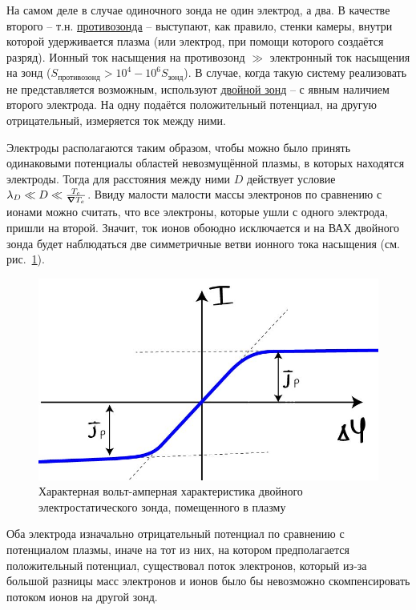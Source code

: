\documentclass[10pt, a4paper]{article}
\begin{document}
%

На самом деле в случае одиночного зонда не один электрод, а два. В качестве второго -- т.н. \uline{противозонда} -- выступают, как правило, стенки камеры, внутри которой удерживается плазма (или электрод, при помощи которого создаётся разряд). Ионный ток насыщения на противозонд $\gg$ электронный ток насыщения на зонд ($S_\text{противозонд}>10^4-10^6 S_\text{зонд}$). В случае, когда такую систему реализовать не представляется возможным, используют \uline{двойной зонд} -- с явным наличием второго электрода. На одну подаётся положительный потенциал, на другую отрицательный, измеряется ток между ними.

Электроды располагаются таким образом, чтобы можно было принять одинаковыми потенциалы областей невозмущённой плазмы, в которых находятся электроды. Тогда для расстояния между ними $D$ действует условие $\lambda_D\ll D\ll \frac{T_e}{\grad{T_e}}$. Ввиду малости малости массы электронов по сравнению с ионами можно считать, что все электроны, которые ушли с одного электрода, пришли на второй. Значит, ток ионов обоюдно исключается и на ВАХ двойного зонда будет наблюдаться две симметричные ветви ионного тока насыщения (см. рис.~\ref{fig:double_Langmuir_probe}).

\begin{figure}[ht]
	\begin{center}
		\includegraphics[width=0.5\linewidth]{VaH_zonda_2.JPG}
	\end{center}
	\caption{Характерная вольт-амперная характеристика двойного электростатического зонда, помещенного в плазму}
	\label{fig:double_Langmuir_probe}
\end{figure}

Оба электрода изначально отрицательный потенциал по сравнению с потенциалом плазмы, иначе на тот из них, на котором предполагается положительный потенциал, существовал поток электронов, который из-за большой разницы масс электронов и ионов было бы невозможно скомпенсировать потоком ионов на другой зонд. 
\end{document}
